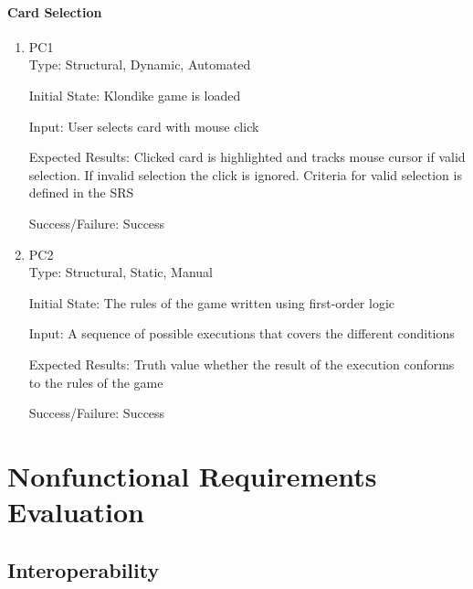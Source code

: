 \documentclass[12pt, titlepage]{article}
\begin{document}
	\paragraph{Card Selection}
	\begin{enumerate}
		\item{PC1\\}
		Type: Structural, Dynamic, Automated
		
		Initial State: Klondike game is loaded
		
		Input: User selects card with mouse click
		
		Expected Results: Clicked card is highlighted and tracks mouse cursor if valid 
		selection. If invalid selection the click is ignored. Criteria for valid 
		selection is defined in the SRS

		Success/Failure: Success

		\item{PC2\\}
		Type: Structural, Static, Manual
		
		Initial State: The rules of the game written using first-order logic
		
		Input: A sequence of possible executions that covers the different conditions
		
		Expected Results: Truth value whether the result of the execution conforms to the rules
		of the game

		Success/Failure: Success
	\end{enumerate} 



\section{Nonfunctional Requirements Evaluation}

\subsection{Interoperability}
	
\end{document}
